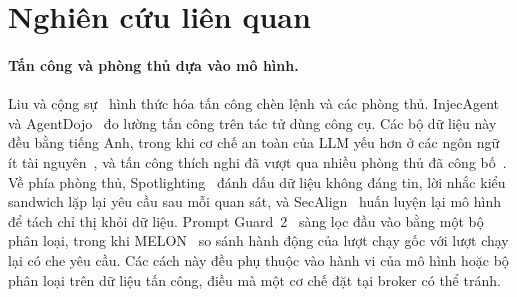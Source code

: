 \section{Nghiên cứu liên quan}\label{sec:related}

\paragraph{Tấn công và phòng thủ dựa vào mô hình.} Liu và cộng sự~\cite{liu2024formalizing} hình thức hóa tấn công chèn
lệnh và các phòng thủ. InjecAgent~\cite{zhan2024injecagent} và AgentDojo~\cite{debenedetti2024agentdojo} đo lường tấn
công trên tác tử dùng công cụ. Các bộ dữ liệu này đều bằng tiếng Anh, trong khi cơ chế an toàn của LLM yếu hơn ở các
ngôn ngữ ít tài nguyên~\cite{deng2024multijail}, và tấn công thích nghi đã vượt qua nhiều phòng thủ đã công
bố~\cite{zhan2025adaptive}. Về phía phòng thủ, Spotlighting~\cite{hines2024spotlighting} đánh dấu dữ liệu không đáng tin,
lời nhắc kiểu sandwich lặp lại yêu cầu sau mỗi quan sát, và SecAlign~\cite{chen2025secalign} huấn luyện lại mô hình để
tách chỉ thị khỏi dữ liệu. Prompt Guard~2~\cite{meta2025promptguard2} sàng lọc đầu vào bằng một bộ phân loại, trong khi
MELON~\cite{zhu2025melon} so sánh hành động của lượt chạy gốc với lượt chạy lại có che yêu cầu. Các cách này đều phụ
thuộc vào hành vi của mô hình hoặc bộ phân loại trên dữ liệu tấn công, điều mà một cơ chế đặt tại broker có thể tránh.


